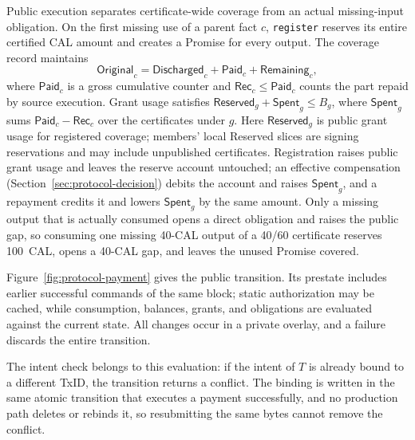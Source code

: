 Public execution separates certificate-wide coverage from an actual missing-input obligation. On the first missing use of a parent fact $c$, \texttt{register} reserves its entire certified CAL amount and creates a Promise for every output. The coverage record maintains
\begin{equation}
  \mathsf{Original}_c=
  \mathsf{Discharged}_c+\mathsf{Paid}_c+\mathsf{Remaining}_c,
  \label{eq:protocol-coverage}
\end{equation}
where $\mathsf{Paid}_c$ is a gross cumulative counter and $\mathsf{Rec}_c\le\mathsf{Paid}_c$ counts the part repaid by source execution. Grant usage satisfies $\mathsf{Reserved}_g+\mathsf{Spent}_g\le B_g$, where $\mathsf{Spent}_g$ sums $\mathsf{Paid}_c-\mathsf{Rec}_c$ over the certificates under $g$. Here $\mathsf{Reserved}_g$ is public grant usage for registered coverage; members' local Reserved slices are signing reservations and may include unpublished certificates. Registration raises public grant usage and leaves the reserve account untouched; an effective compensation (Section~\ref{sec:protocol-decision}) debits the account and raises $\mathsf{Spent}_g$, and a repayment credits it and lowers $\mathsf{Spent}_g$ by the same amount. Only a missing output that is actually consumed opens a direct obligation and raises the public gap, so consuming one missing 40-CAL output of a 40/60 certificate reserves 100~CAL, opens a 40-CAL gap, and leaves the unused Promise covered.

Figure~\ref{fig:protocol-payment} gives the public transition. Its prestate includes earlier successful commands of the same block; static authorization may be cached, while consumption, balances, grants, and obligations are evaluated against the current state. All changes occur in a private overlay, and a failure discards the entire transition.

The intent check belongs to this evaluation: if the intent of $T$ is already bound to a different TxID, the transition returns a conflict. The binding is written in the same atomic transition that executes a payment successfully, and no production path deletes or rebinds it, so resubmitting the same bytes cannot remove the conflict.

